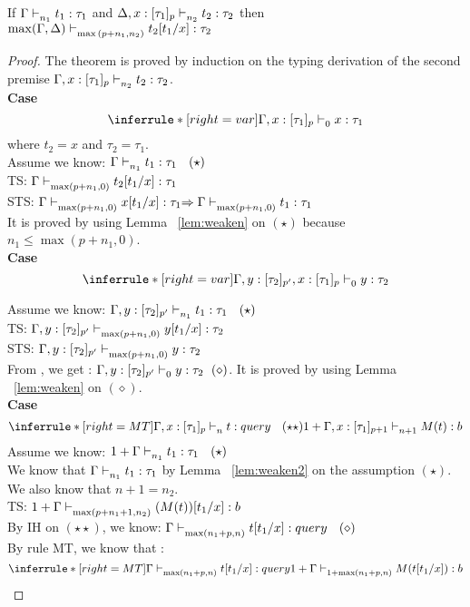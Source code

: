 \documentclass{article}
\begin{document}
\clearpage
\begin{theorem} [Substitution]
	If $\Gamma \mathrel{\vdash_{n_1}^{} {t_1} : {\tau_1}}$  and   $\Delta, x: [\tau_1]_p \mathrel{\vdash_{n_2}^{} {t_2} : {\tau_2}}$ then $\max( \Gamma,\Delta) \mathrel{\vdash_{\max{(p + n_1, n_2)}}^{} {t_2[t_1/x]} : {\tau_2}} $
\end{theorem}
\begin{proof}
  The theorem is proved by induction on the typing derivation of the second premise  $\Gamma, x: [\tau_1]_p \mathrel{\vdash_{n_2}^{} {t_2} : {\tau_2}}$. \\
   
  \noindent \textbf{Case}
  \[
   \inferrule*[ right = var]
   {\empty}
   {\Gamma, x:[\tau_1]_p \jtype{0}{}{x}{\tau_1}  } 
  \]
  where $t_2 = x$ and $\tau_2 = \tau_1$.\\
  Assume we know: $\Gamma \jtype{n_1}{}{t_1}{\tau_1} \ \ (\star) $ \\
  TS: $\Gamma \mathrel{\vdash_{\max(p+n_1,0 )}^{} {t_2[t_1/x]} : {\tau_1}}$ \\
  STS: $\Gamma \mathrel{\vdash_{\max(p+n_1,0)}^{} {x[t_1/x]} : {\tau_1}} \Rightarrow \Gamma \mathrel{\vdash_{\max(p+n_1,0)}^{} {t_1} : {\tau_1}}$ \\
  It is proved by using Lemma ~\ref{lem:weaken} on $(\star)$ because $n_1 \leq \max(p+n_1, 0)$.\\
  
  \noindent \textbf{Case}
  \[
   \inferrule*[ right = var]
   {\empty}
   {\Gamma, y:[\tau_2]_{p'} , x:[\tau_1]_p \jtype{0}{}{y}{\tau_2}  }
  \]
 
  Assume we know: $\Gamma, y: [\tau_2]_{p'} \jtype{n_1}{}{t_1}{\tau_1} \ \ (\star) $ \\
  TS: $\Gamma, y: [\tau_2]_{p'} \mathrel{\vdash_{\max(p+n_1,0 )}^{} {y[t_1/x]} : {\tau_2}}$ \\
  STS: $\Gamma, y: [\tau_2]_{p'} \mathrel{\vdash_{\max(p+n_1,0)}^{} {y} : {\tau_2}} $ \\
  From , we get : $ \Gamma, y: [\tau_2]_{p'} \mathrel{\vdash_{0}^{} {y} : {\tau_2}} ~(\diamond) $.
  It is proved by using Lemma ~\ref{lem:weaken} on $(\diamond)$.\\
  
    \noindent \textbf{Case}
     \[
   \inferrule*[ right = MT ]
   {\Gamma, x: [\tau_1]_{p} \jtype{n}{}{t}{query} \ \ (\star\star)}
   {1 + \Gamma, x: [\tau_1]_{p+1} \jtype{n+1}{}{M(t)}{b}  }
  \]
  Assume we know: $1+\Gamma \jtype{n_1}{}{t_1}{\tau_1} \ \ (\star) $ \\
   We know that $\Gamma \mathrel{\vdash_{n_1}^{} {t_1} : {\tau_1 }} $ by Lemma ~\ref{lem:weaken2} on the assumption $(\star)$.\\
   We also know that $n+1=n_2$.\\
   TS:  $1+\Gamma \mathrel{\vdash_{\max(p+n_1+1,n_2)}^{} { (M(t)) [t_1/x]} : {b}}$ \\
   By IH on $(\star\star)$, we know: $ \Gamma \mathrel{\vdash_{\max(n_1+p, n) }^{} {t[t_1/x] } : {query}} \ \ (\diamond) $\\
   By rule MT, we know that : 
     \[
   \inferrule*[ right = MT ]
   {\Gamma \jtype{\max(n_1+p, n) }{}{t[t_1/x] }{query} }
   {1 + \Gamma \jtype{  1+ \max(n_1+p, n) }{}{M(t[t_1/x])}{b}  }
  \]
  

\end{proof}
\end{document}
